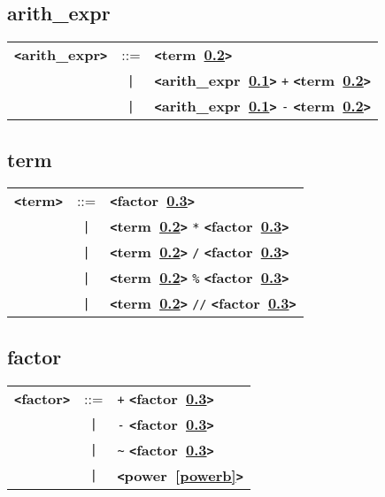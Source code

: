 \documentclass[12pt]{article}
\begin{document}
\subsection{arith\_expr}
\label{arithzzzexprb}
\begin{tabular}{lcl}
{\bf \verb+<+arith\_expr\verb+>+} & ::=  & {\bf \verb+<+term~\ref{termb}\verb+>+}  \\
 & \verb+|+  & {\bf \verb+<+arith\_expr~\ref{arithzzzexprb}\verb+>+}  \verb|+| {\bf \verb+<+term~\ref{termb}\verb+>+}  \\
 & \verb+|+  & {\bf \verb+<+arith\_expr~\ref{arithzzzexprb}\verb+>+}  \verb|-| {\bf \verb+<+term~\ref{termb}\verb+>+}  \\
\end{tabular}

\subsection{term}
\label{termb}
\begin{tabular}{lcl}
{\bf \verb+<+term\verb+>+} & ::=  & {\bf \verb+<+factor~\ref{factorb}\verb+>+}  \\
 & \verb+|+  & {\bf \verb+<+term~\ref{termb}\verb+>+}  \verb|*| {\bf \verb+<+factor~\ref{factorb}\verb+>+}  \\
 & \verb+|+  & {\bf \verb+<+term~\ref{termb}\verb+>+}  \verb|/| {\bf \verb+<+factor~\ref{factorb}\verb+>+}  \\
 & \verb+|+  & {\bf \verb+<+term~\ref{termb}\verb+>+}  \verb|%| {\bf \verb+<+factor~\ref{factorb}\verb+>+}  \\
 & \verb+|+  & {\bf \verb+<+term~\ref{termb}\verb+>+}  \verb|//| {\bf \verb+<+factor~\ref{factorb}\verb+>+}  \\
\end{tabular}

\subsection{factor}
\label{factorb}
\begin{tabular}{lcl}
{\bf \verb+<+factor\verb+>+} & ::=  & \verb|+| {\bf \verb+<+factor~\ref{factorb}\verb+>+}  \\
 & \verb+|+  & \verb|-| {\bf \verb+<+factor~\ref{factorb}\verb+>+}  \\
 & \verb+|+  & \verb|~| {\bf \verb+<+factor~\ref{factorb}\verb+>+}  \\
 & \verb+|+  & {\bf \verb+<+power~\ref{powerb}\verb+>+}  \\
\end{tabular}
\end{document}
